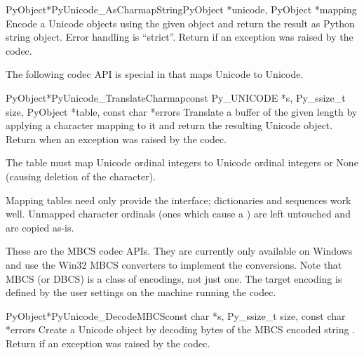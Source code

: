 \begin{cfuncdesc}{PyObject*}{PyUnicode_AsCharmapString}{PyObject *unicode,
                                                        PyObject *mapping}
  Encode a Unicode objects using the given  object and
  return the result as Python string object.  Error handling is
  ``strict''.  Return \NULL{} if an exception was raised by the
  codec.
\end{cfuncdesc}

The following codec API is special in that maps Unicode to Unicode.

\begin{cfuncdesc}{PyObject*}{PyUnicode_TranslateCharmap}{const Py_UNICODE *s,
                                               Py_ssize_t size,
                                               PyObject *table,
                                               const char *errors}
  Translate a  buffer of the given length by
  applying a character mapping  to it and return the
  resulting Unicode object.  Return \NULL{} when an exception was
  raised by the codec.

  The  table must map Unicode ordinal integers to Unicode
  ordinal integers or None (causing deletion of the character).

  Mapping tables need only provide the 
  interface; dictionaries and sequences work well.  Unmapped character
  ordinals (ones which cause a ) are left
  untouched and are copied as-is.
\end{cfuncdesc}


These are the MBCS codec APIs. They are currently only available on
Windows and use the Win32 MBCS converters to implement the
conversions.  Note that MBCS (or DBCS) is a class of encodings, not
just one.  The target encoding is defined by the user settings on the
machine running the codec.

\begin{cfuncdesc}{PyObject*}{PyUnicode_DecodeMBCS}{const char *s,
                                               Py_ssize_t size,
                                               const char *errors}
  Create a Unicode object by decoding  bytes of the MBCS
  encoded string .  Return \NULL{} if an exception was
  raised by the codec.
\end{cfuncdesc}

